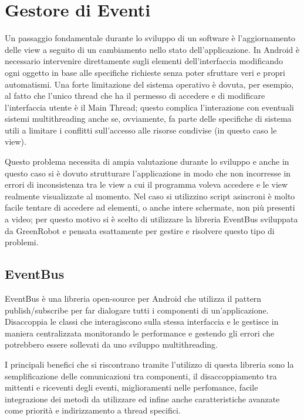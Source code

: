 {\section{Gestore di Eventi}

Un passaggio fondamentale durante lo sviluppo di un software è l'aggiornamento
delle view a seguito di un cambiamento nello stato dell'applicazione.
In Android è necessario intervenire direttamente sugli elementi dell'interfaccia
modificando ogni oggetto in base alle specifiche richieste senza poter
sfruttare veri e propri automatismi. Una forte limitazione del sistema
operativo è dovuta, per esempio, al fatto che l'unico thread che ha
il permesso di accedere e di modificare l'interfaccia utente è il
Main Thread; questo complica l'interazione con eventuali sistemi multithreading
anche se, ovviamente, fa parte delle specifiche di sistema utili a
limitare i conflitti sull'accesso alle risorse condivise (in questo
caso le view).

Questo problema necessita di ampia valutazione durante lo sviluppo
e anche in questo caso si è dovuto strutturare l'applicazione in modo
che non incorresse in errori di inconsistenza tra le view a cui il
programma voleva accedere e le view realmente visualizzate al momento.
Nel caso si utilizzino script asincroni è molto facile tentare di
accedere ad elementi, o anche intere schermate, non più presenti a
video; per questo motivo si è scelto di utilizzare la libreria EventBus
sviluppata da GreenRobot \autocite{GITHUB:EVENTBUS} e pensata esattamente
per gestire e risolvere questo tipo di problemi.

\subsection{EventBus}

EventBus è una libreria open-source per Android che utilizza il pattern
publish/subscribe per far dialogare tutti i componenti di un'applicazione.
Disaccoppia le classi che interagiscono sulla stessa interfaccia e
le gestisce in maniera centralizzata monitorando le performance e
gestendo gli errori che potrebbero essere sollevati da uno sviluppo
multithreading.\autocite{GREENROBOT:EVENTBUS}

I principali benefici che si riscontrano tramite l'utilizzo di questa
libreria sono la semplificazione delle comunicazioni tra componenti,
il disaccoppiamento tra mittenti e riceventi degli eventi, miglioramenti
nelle perfomance, facile integrazione dei metodi da utilizzare ed
infine anche caratteristiche avanzate come priorità e indirizzamento
a thread specifici.

}
